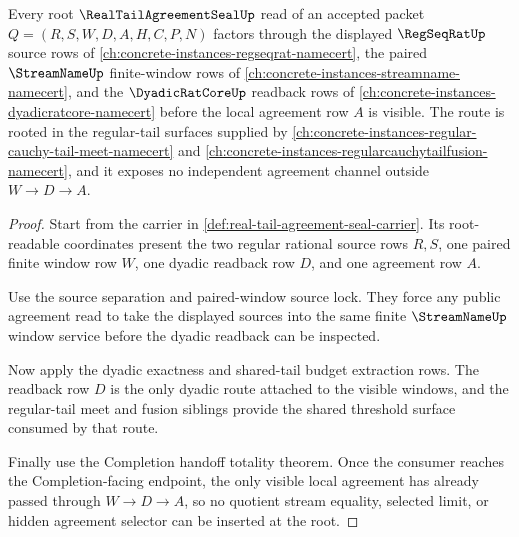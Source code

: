 \begin{theorem}
\label{thm:realtailagreementseal-root-window-readback}
Every root $\RealTailAgreementSealUp$ read of an accepted packet $Q=(R,S,W,D,A,H,C,P,N)$ factors through the displayed $\RegSeqRatUp$ source rows of \autoref{ch:concrete-instances-regseqrat-namecert}, the paired $\StreamNameUp$ finite-window rows of \autoref{ch:concrete-instances-streamname-namecert}, and the $\DyadicRatCoreUp$ readback rows of \autoref{ch:concrete-instances-dyadicratcore-namecert} before the local agreement row $A$ is visible. The route is rooted in the regular-tail surfaces supplied by \autoref{ch:concrete-instances-regular-cauchy-tail-meet-namecert} and \autoref{ch:concrete-instances-regularcauchytailfusion-namecert}, and it exposes no independent agreement channel outside $W \to D \to A$.
\end{theorem}
\begin{proof}
Start from the carrier in \autoref{def:real-tail-agreement-seal-carrier}. Its root-readable coordinates present the two regular rational source rows $R,S$, one paired finite window row $W$, one dyadic readback row $D$, and one agreement row $A$.

Use the source separation and paired-window source lock. They force any public agreement read to take the displayed sources into the same finite $\StreamNameUp$ window service before the dyadic readback can be inspected.

Now apply the dyadic exactness and shared-tail budget extraction rows. The readback row $D$ is the only dyadic route attached to the visible windows, and the regular-tail meet and fusion siblings provide the shared threshold surface consumed by that route.

Finally use the Completion handoff totality theorem. Once the consumer reaches the Completion-facing endpoint, the only visible local agreement has already passed through $W \to D \to A$, so no quotient stream equality, selected limit, or hidden agreement selector can be inserted at the root.
\end{proof}

